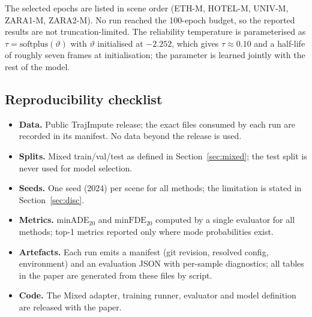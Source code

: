 The selected epochs are listed in scene order (ETH-M, HOTEL-M, UNIV-M, ZARA1-M, ZARA2-M). No run reached the 100-epoch budget, so the reported results are not truncation-limited. The reliability temperature is parameterised as $\tau=\mathrm{softplus}(\vartheta)$ with $\vartheta$ initialised at $-2.252$, which gives $\tau\approx0.10$ and a half-life of roughly seven frames at initialisation; the parameter is learned jointly with the rest of the model.

\subsection{Reproducibility checklist}
\label{app:checklist}

\begin{itemize}
\item \textbf{Data.} Public TrajImpute release; the exact files consumed by each run are recorded in its manifest. No data beyond the release is used.
\item \textbf{Splits.} Mixed train/val/test as defined in Section~\ref{sec:mixed}; the test split is never used for model selection.
\item \textbf{Seeds.} One seed (2024) per scene for all methods; the limitation is stated in Section~\ref{sec:disc}.
\item \textbf{Metrics.} $\mathrm{minADE}_{20}$ and $\mathrm{minFDE}_{20}$ computed by a single evaluator for all methods; top-1 metrics reported only where mode probabilities exist.
\item \textbf{Artefacts.} Each run emits a manifest (git revision, resolved config, environment) and an evaluation JSON with per-sample diagnostics; all tables in the paper are generated from these files by script.
\item \textbf{Code.} The Mixed adapter, training runner, evaluator and model definition are released with the paper.
\end{itemize}
